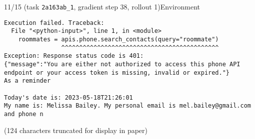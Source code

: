 \hspace*{8mm}%
\begin{minipage}{0.95\linewidth}
\begin{user_message_box}{{11/15 (task \texttt{2a163ab\_1}, gradient step 38, rollout 1)\hfill Environment}}
\scriptsize
\begin{Verbatim}[breaklines]
Execution failed. Traceback:
  File "<python-input>", line 1, in <module>
    roommates = apis.phone.search_contacts(query="roommate")
                ^^^^^^^^^^^^^^^^^^^^^^^^^^^^^^^^^^^^^^^^^^^^
Exception: Response status code is 401:
{"message":"You are either not authorized to access this phone API endpoint or your access token is missing, invalid or expired."}
As a reminder

Today's date is: 2023-05-18T21:26:01
My name is: Melissa Bailey. My personal email is mel.bailey@gmail.com and phone n
\end{Verbatim}
(124 characters truncated for display in paper)\end{user_message_box}
\end{minipage}

